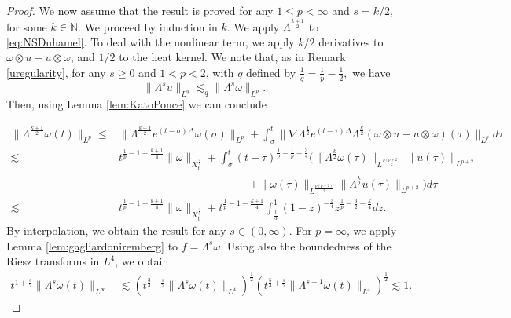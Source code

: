 \documentclass[10pt,a4paper]{amsart}
\newcommand{\N}{\mathbb{N}}
\def\heat#1{e^{#1 \Delta}}
\newcommand{\na}{\nabla}
\newcommand{\w}{\omega}
\begin{document}
\begin{proof}
We now assume that the result is proved for any $1\leq p<\infty$ and $s=k/2$, for some $k\in \N$. We proceed by induction in $k$.  We apply $\Lambda^{\frac{k+1}{2}}$ to \eqref{eq:NSDuhamel}. To deal with the nonlinear term, we apply $k/2$ derivatives to $\omega\otimes u-u\otimes \w$, and $1/2$ to the heat kernel. We note that, as in Remark \ref{uregularity}, for any $s\geq 0$ and $1<p<2$, with $q$ defined by
$
\frac{1}{q}=\frac{1}{p}-\frac{1}{2},
$
we have
\begin{equation}\label{eq:bounduwgeneral}
\|\Lambda^s u\|_{L^q}\lesssim_q\|\Lambda^s\w\|_{L^p}.
\end{equation} Then, using Lemma \ref{lem:KatoPonce} we can conclude 

$$
\begin{aligned}
\|\Lambda^\frac{k+1}{2}\w(t)\|_{L^p}\leq& \|\Lambda^\frac{k+1}{2}\heat{(t-\sigma)}\w(\sigma)\|_{L^p}+\int_\sigma^t\|\na\Lambda^{\frac{1}{2}}\heat{(t-\tau)}\Lambda^\frac{k}{2}(\w\otimes u-u\otimes \w)(\tau)\|_{L^p}d\tau\\
\lesssim & t^{\frac{1}{p}-1-\frac{k+1}{4}}\|\omega\|_{X_t^{\frac{4}{3}}}+\int_\sigma^t (t-\tau)^{\frac{1}{p}-\frac{1}{p}-\frac{3}{4}}\big(\|\Lambda^\frac{k}{2}\w(\tau)\|_{L^{\frac{p(p+2)}{2}}}\|u(\tau)\|_{L^{p+2}}\\
&\hspace{5cm}+\|\w(\tau)\|_{L^{\frac{p(p+2)}{2}}}\|\Lambda^\frac{k}{2}u(\tau)\|_{L^{p+2}}\big)d\tau\\
\lesssim & t^{\frac{1}{p}-1-\frac{k+1}{4}}\|\omega\|_{X_t^{\frac{4}{3}}}+ t^{\frac{1}{p}-1-\frac{k+1}{4}}\int_{\frac{1}{3}}^1 (1-z)^{-\frac{3}{4}}z^{\frac{1}{p}-\frac{3}{2}-\frac{k}{4}}dz.
\end{aligned}$$
By interpolation, we obtain the result for any $s\in(0,\infty)$. 
For $p=\infty$, we apply Lemma \ref{lem:gagliardoniremberg} to
$f=\Lambda^s\omega$. Using also the boundedness of the Riesz
transforms in $L^4$, we obtain
$$
\begin{aligned}
t^{1+\frac s2}\|\Lambda^s\omega(t)\|_{L^\infty}
&\lesssim
\left(
t^{\frac34+\frac s2}
\|\Lambda^s\omega(t)\|_{L^4}
\right)^{\frac12}
\left(
t^{\frac54+\frac s2}
\|\Lambda^{s+1}\omega(t)\|_{L^4}
\right)^{\frac12}\lesssim 1.
\end{aligned}
$$
\end{proof}
\end{document}
